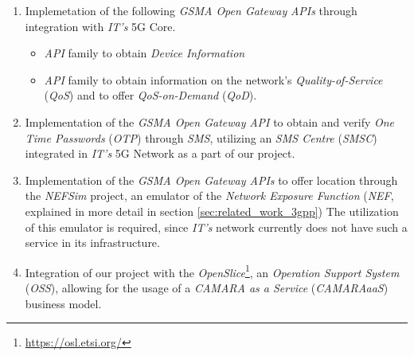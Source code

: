 \begin{enumerate} 
  \item Implemetation of the following \emph{GSMA
      Open Gateway} \emph{APIs} through integration with
      \emph{IT's} 5G Core. 
    \begin{itemize}
      \item \emph{API} family to obtain \emph{Device Information}
      \item \emph{API} family to obtain information on the
        network's \emph{Quality-of-Service} (\emph{QoS}) and to
        offer \emph{QoS-on-Demand} (\emph{QoD}).
    \end{itemize}

  \item Implementation of the \emph{GSMA
    Open Gateway} \emph{API} to obtain and verify \emph{One Time
    Passwords} (\emph{OTP}) through \emph{SMS}, utilizing an 
    \emph{SMS Centre} (\emph{SMSC}) integrated in \emph{IT's} 5G
    Network as a part of our project.

  \item Implementation of the \emph{GSMA Open Gateway APIs} to
    offer location through the \emph{NEFSim} project, an emulator
    of the \emph{Network Exposure Function} (\emph{NEF},
    explained in more detail in section
    \ref{sec:related_work_3gpp}) The utilization of this emulator
    is required, since \emph{IT's} network currently does not have
    such a service in its infrastructure.

  \item Integration of our project with the 
    \emph{OpenSlice}\footnote{\url{https://osl.etsi.org/}}, an
    \emph{Operation Support System} (\emph{OSS}), allowing for
    the usage of a \emph{CAMARA as a Service} (\emph{CAMARAaaS})
    business model.


\end{enumerate}
